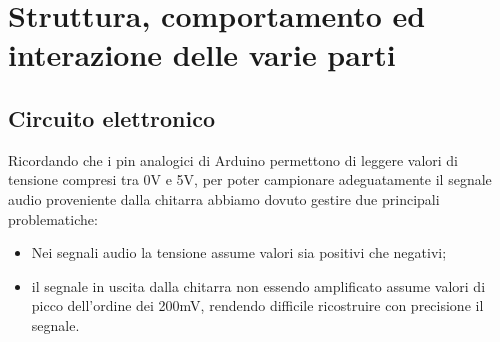 \documentclass[a4paper,11pt]{article}
\begin{document}
\section{Struttura, comportamento ed interazione delle varie parti}


\subsection{Circuito elettronico}
Ricordando che i pin analogici di Arduino permettono di leggere valori di tensione compresi tra 0V e 5V, per poter campionare adeguatamente il segnale audio proveniente dalla chitarra abbiamo dovuto gestire due principali problematiche:
\begin{itemize}
    \item Nei segnali audio la tensione assume valori sia positivi che negativi;
    \item il segnale in uscita dalla chitarra non essendo amplificato assume valori di picco dell'ordine dei 200mV, rendendo difficile ricostruire con precisione il segnale.
\end{itemize}
\end{document}
